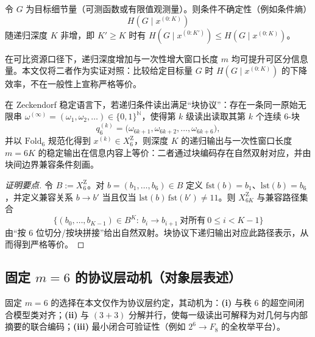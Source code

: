 \begin{proposition}[R2：条件不确定性的单调性]\label{prop:R2-monotone-conditional-uncertainty}
令 $G$ 为目标细节量（可测函数或有限值观测量）。则条件不确定性（例如条件熵）
$$
H(G\mid x^{(0:K)})
$$
随递归深度 $K$ 非增，即 $K'\ge K$ 时有 $H(G\mid x^{(0:K')})\le H(G\mid x^{(0:K)})$。
\end{proposition}

\begin{proposition}\label{prop:R3-K-vs-m}
在可比资源口径下，递归深度增加与一次性增大窗口长度 $m$ 均可提升可区分信息量。本文仅将二者作为实证对照：比较给定目标量 $G$ 时 $H(G\mid x^{(0:K)})$ 的下降效率，不在一般性上宣称严格等价。
\end{proposition}

\begin{proposition}\label{prop:R4-block-equivalence}
在 Zeckendorf 稳定语言下，若递归条件读出满足“块协议”：存在一条同一原始无限串 $\omega^{(\infty)}=(\omega_1,\omega_2,\dots)\in\{0,1\}^{\mathbb{N}}$，使得第 $k$ 级读出读取其第 $k$ 个连续 6-块
\[
q_6^{(k)}=\bigl(\omega_{6k+1},\omega_{6k+2},\dots,\omega_{6k+6}\bigr),
\]
并以 $\mathrm{Fold}_6$ 规范化得到 $x^{(k)}\in X_6^{\mathrm Z}$，则深度 $K$ 的递归输出与一次性窗口长度 $m=6K$ 的稳定输出在信息内容上等价：二者通过块编码存在自然双射对应，并由块间边界兼容条件刻画。
\end{proposition}

\begin{proof}[证明要点]
令 $B:=X_6^{\mathrm Z}$。对 $b=(b_1,\dots,b_6)\in B$ 定义 $\mathrm{fst}(b)=b_1$、$\mathrm{lst}(b)=b_6$，并定义兼容关系 $b\to b'$ 当且仅当 $\mathrm{lst}(b)\,\mathrm{fst}(b')\neq 11$。则 $X_{6K}^{\mathrm Z}$ 与兼容路径集合
\[
\{(b_0,\dots,b_{K-1})\in B^K:\ b_i\to b_{i+1}\ \text{对所有}\ 0\le i<K-1\}
\]
由“按 6 位切分/按块拼接”给出自然双射。块协议下递归输出对应此路径表示，从而得到严格等价。
\end{proof}

\subsection{固定 $m=6$ 的协议层动机（对象层表述）}
固定 $m=6$ 的选择在本文仅作为协议层约定，其动机为：\textbf{(i)} 与秩 $6$ 的超空间闭合模型类对齐；\textbf{(ii)} 与 $(3+3)$ 分解并行，使每一级读出可解释为对几何与内部摘要的联合编码；\textbf{(iii)} 最小闭合可验证性（例如 $2^6\to F_8$ 的全枚举平台）。

